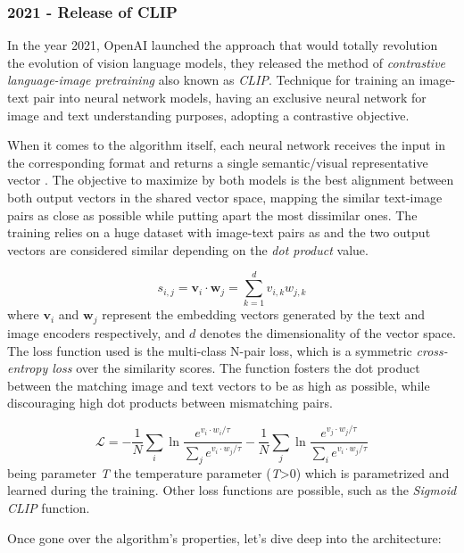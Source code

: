 \subsubsection{2021 - Release of CLIP}
In the year 2021, OpenAI launched the approach that would totally revolution the evolution of vision language models, they released the method of \textit{contrastive language-image pretraining} also known as \textit{CLIP}. Technique for training an image-text pair into neural network models, having an exclusive neural network for image and text understanding purposes, adopting a contrastive objective. 

When it comes to the algorithm itself, each neural network receives the input in the corresponding format and returns a single semantic/visual representative vector \cite{wiki:clip}. The objective to maximize by both models is the best alignment between both output vectors in the shared vector space, mapping the similar text-image pairs as close as possible while putting apart the most dissimilar ones. The training relies on a huge dataset with image-text pairs as and the two output vectors are considered similar depending on the \textit{dot product} value. 

\begin{equation}
	s_{i,j} = \mathbf{v}_i \cdot \mathbf{w}_j = \sum_{k=1}^{d} v_{i,k} w_{j,k}
\end{equation}
where $\mathbf{v}_i$ and $\mathbf{w}_j$ represent the embedding vectors generated by the text and image encoders respectively, and $d$ denotes the dimensionality of the vector space. The loss function used is the multi-class N-pair loss, which is a symmetric \textit{cross-entropy loss} over the similarity scores. The function fosters the dot product between the matching image and text vectors to be as high as possible, while discouraging high dot products between mismatching pairs. 

\begin{equation}
	\mathcal{L} = -\frac{1}{N} \sum_{i} \ln \frac{e^{v_i \cdot w_i / \tau}}{\sum_{j} e^{v_i \cdot w_j / \tau}} - \frac{1}{N} \sum_{j} \ln \frac{e^{v_j \cdot w_j / \tau}}{\sum_{i} e^{v_i \cdot w_j / \tau}}
\end{equation}
being parameter \textit{T} the temperature parameter (\textit{T}>0) which is parametrized and learned during the training. Other loss functions are possible, such as the \textit{Sigmoid CLIP} function.

Once gone over the algorithm's properties, let's dive deep into the architecture:

